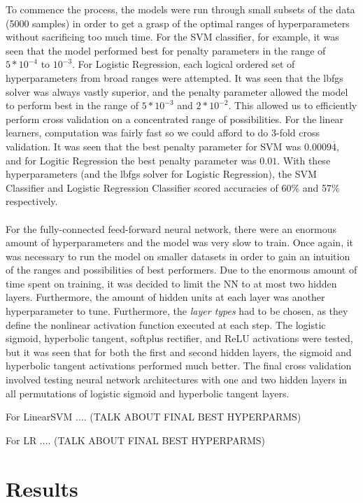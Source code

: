 \documentclass[10pt, hidelinks]{article}
\begin{document}
To commence the process, the models were run through small subsets of the data (5000 samples) in order to get a
grasp of the optimal ranges of hyperparameters without sacrificing too much time. For the SVM
classifier, for example, it was seen that the model performed best for penalty parameters in the
range of $5*10^{-4}$ to $10^{-3}$. For Logistic Regression, each logical ordered set of
hyperparameters from broad ranges were attempted. It was seen that the lbfgs solver was always vastly
superior, and the penalty parameter allowed the model to perform best in the range of $5*10^{-3}$
and $2*10^{-2}$. This allowed us to efficiently perform cross validation on a concentrated range of
possibilities. For the linear learners, computation was fairly fast so we could afford to do 3-fold
cross validation. It was seen that the best penalty parameter for SVM was $0.0009\overline{4}$, and
for Logitic Regression the best penalty parameter was $0.01$. With these hyperparameters (and the
lbfgs solver for Logistic Regression), the SVM Classifier and Logistic Regression Classifier scored
accuracies of 60\% and 57\% respectively.\\\\
For the fully-connected feed-forward neural network, there were an enormous amount of
hyperparameters and the model was very slow to train. Once again, it was necessary to run the model
on smaller datasets in order to gain an intuition of the ranges and possibilities of best
performers. Due to the enormous amount of time spent on training, it was decided to limit the NN to
at most two hidden layers. Furthermore, the amount of hidden units at each layer was another
hyperparameter to tune. Furthermore, the \textit{layer types} had to be chosen, as they define the
nonlinear activation function executed at each step. The logistic sigmoid, hyperbolic tangent,
softplus rectifier, and ReLU activations were tested, but it was seen that for both the first and
second hidden layers, the sigmoid and hyperbolic tangent activations performed much better. The
final cross validation involved testing neural network architectures with one and two hidden layers
in all permutations of logistic sigmoid and hyperbolic tangent layers.

\noindent For LinearSVM .... (TALK ABOUT FINAL BEST HYPERPARMS)

\noindent For LR .... (TALK ABOUT FINAL BEST HYPERPARMS)

\section*{Results}
\end{document}
